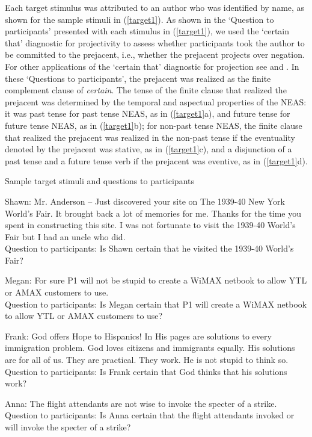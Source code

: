 \documentclass[11pt,fleqn]{article}
\newcommand{\6}{\mbox{$[\hspace*{-.6mm}[$}}
\newcommand{\9}{\mbox{$]\hspace*{-.6mm}]$}}
\begin{document}
Each target stimulus was attributed to an author who was identified by name, as shown for the sample stimuli in (\ref{target1}). As shown in the `Question to participants' presented with each stimulus in (\ref{target1}), we used the `certain that' diagnostic for projectivity to assess whether participants took the author to be committed to the prejacent, i.e., whether the prejacent projects over negation. For other applications of the `certain that' diagnostic for projection see \citealt{tonhauser-salt26,djaerv-bacovcin-salt27,stevens-etal2017} and \citealt{tbd-variability}. In these `Questions to participants', the prejacent was realized as the finite complement clause of {\em certain}. The tense of the finite clause that realized the prejacent was determined by the temporal and aspectual properties of the
NEAS: it was past tense for past tense NEAS, as in (\ref{target1}a), and future tense for future tense NEAS, as in (\ref{target1}b); for non-past tense NEAS, the finite clause that realized the prejacent was realized in the non-past tense if the eventuality denoted by the prejacent was
stative, as in (\ref{target1}c), and a disjunction of a past tense and a future tense verb if the prejacent was eventive, as in (\ref{target1}d).


\begin{exe} \ex\label{target1} Sample target stimuli and questions to
participants 

\begin{xlist} 

\ex Shawn: Mr. Anderson --  Just discovered your
site on The 1939-40 New York World's Fair. It brought back a lot of
memories for me. Thanks for the time you spent in constructing this
site. I was not fortunate to visit the 1939-40 World's Fair but I
had an uncle who did.
\\ Question to participants: Is Shawn certain that he visited the 1939-40 World's Fair?

\ex Megan: For sure P1 will not be stupid to create a WiMAX netbook to allow YTL or AMAX customers to use.
\\ Question to participants: Is Megan certain that P1 will create a WiMAX netbook to allow YTL or AMAX customers to use?

\ex Frank: God offers Hope to Hispanics! In His pages are solutions to every immigration problem. God loves citizens and immigrants equally. His solutions are for all of us. They are practical. They work. He is not stupid to think so.
\\ Question to participants: Is Frank certain that God thinks that his solutions work?

\ex Anna: The flight attendants are not wise to invoke the specter
of a strike. \\ Question to participants: Is Anna certain that the
flight attendants invoked or will invoke the specter of a strike?

\end{xlist}
\end{exe}
\end{document}
